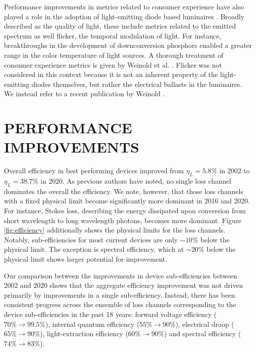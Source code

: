 \documentclass[a4paper,nocompress]{spie}  %
\begin{document}
    Performance improvements in metrics related to consumer experience have also played a role in the adoption of light-emitting diode based luminaires \cite{cowan2011understanding}. Broadly described as the quality of light, these include metrics related to the emitted spectrum as well flicker, the temporal modulation of light. For instance, breakthroughs in the development of downconversion phosphors enabled a greater range in the color temperature of light sources. A thorough treatment of consumer experience metrics is given by Weinold et al. \cite{weinold2020technology}. Flicker was not considered in this context because it is not an inherent property of the light-emitting diodes themselves, but rather the electrical ballasts in the luminaires. We instead refer to a recent publication by Weinold \cite{weinold2020long}. 

\section{PERFORMANCE IMPROVEMENTS}

     Overall efficiency in best performing devices improved from $\eta_L=5.8\%$ in 2002 to $\eta_L = 38.7\%$ in 2020. As previous authors have noted, no single loss channel dominates the overall the efficiency\cite{tsao2010solid}. We note, however, that those loss channels with a fixed physical limit become significantly more dominant in 2016 and 2020. For instance, Stokes loss, describing the energy dissipated upon conversion from short wavelength to long wavelength photons, becomes more dominant. Figure \ref{fig:efficiency} additionally shows the physical limits for the loss channels. Notably, sub-efficiencies for most current devices are only $\sim10\%$ below the physical limit. The exception is spectral efficiency, which at $\sim20\%$ below the physical limit shows larger potential for improvement.
     
     Our comparison between the improvements in device sub-efficiencies between 2002 and 2020 shows that the aggregate efficiency improvement was not driven primarily by improvements in a single sub-efficiency. Instead, there has been consistent progress across the ensemble of loss channels corresponding to the device sub-efficiencies in the past 18 years: forward voltage efficiency ($70\%\rightarrow99.5\%$), internal quantum efficiency ($55\%\rightarrow90\%)$, electrical droop ($65\%\rightarrow90\%$), light-extraction efficiency ($60\%\rightarrow90\%$) and spectral efficiency ($74\% \rightarrow83\%$).
     
\end{document}
